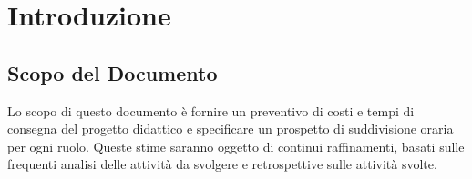 \section{Introduzione}\label{section:introduzione}

\subsection{Scopo del Documento}

Lo scopo di questo documento è fornire un preventivo di costi e tempi di consegna del progetto didattico e
specificare un prospetto di suddivisione oraria per ogni ruolo.
Queste stime saranno oggetto di continui raffinamenti, basati sulle frequenti analisi delle attività
da svolgere e retrospettive sulle attività svolte.



